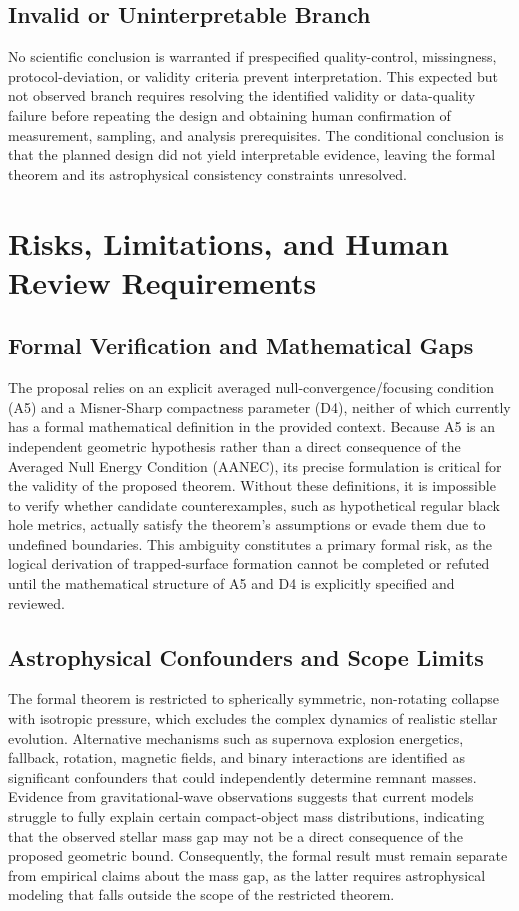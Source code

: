 \documentclass[conference]{IEEEtran}
\begin{document}
\subsection{Invalid or Uninterpretable Branch}
No scientific conclusion is warranted if prespecified quality-control, missingness, protocol-deviation, or validity criteria prevent interpretation. This expected but not observed branch requires resolving the identified validity or data-quality failure before repeating the design and obtaining human confirmation of measurement, sampling, and analysis prerequisites. The conditional conclusion is that the planned design did not yield interpretable evidence, leaving the formal theorem and its astrophysical consistency constraints unresolved.

\section{Risks, Limitations, and Human Review Requirements}
\subsection{Formal Verification and Mathematical Gaps}
The proposal relies on an explicit averaged null-convergence/focusing condition (A5) and a Misner-Sharp compactness parameter (D4), neither of which currently has a formal mathematical definition in the provided context. Because A5 is an independent geometric hypothesis rather than a direct consequence of the Averaged Null Energy Condition (AANEC), its precise formulation is critical for the validity of the proposed theorem. Without these definitions, it is impossible to verify whether candidate counterexamples, such as hypothetical regular black hole metrics, actually satisfy the theorem's assumptions or evade them due to undefined boundaries. This ambiguity constitutes a primary formal risk, as the logical derivation of trapped-surface formation cannot be completed or refuted until the mathematical structure of A5 and D4 is explicitly specified and reviewed.

\subsection{Astrophysical Confounders and Scope Limits}
The formal theorem is restricted to spherically symmetric, non-rotating collapse with isotropic pressure, which excludes the complex dynamics of realistic stellar evolution. Alternative mechanisms such as supernova explosion energetics, fallback, rotation, magnetic fields, and binary interactions are identified as significant confounders that could independently determine remnant masses. Evidence from gravitational-wave observations suggests that current models struggle to fully explain certain compact-object mass distributions, indicating that the observed stellar mass gap may not be a direct consequence of the proposed geometric bound. Consequently, the formal result must remain separate from empirical claims about the mass gap, as the latter requires astrophysical modeling that falls outside the scope of the restricted theorem.~\cite{cite_07d6df5d6978a1fc,cite_f634820e22d7a238,cite_789b47fb0241d9ae}
\end{document}
